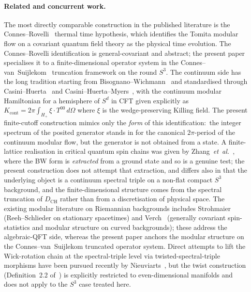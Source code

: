 \documentclass[11pt,a4paper]{article}
\theoremstyle{plain}
\theoremstyle{definition}
\newcommand{\sthree}{S^{3}}
\newcommand{\DCH}{D_{\mathrm{CH}}}
\begin{document}
\paragraph{Related and concurrent work.}
The most directly comparable construction in the published literature
is the Connes--Rovelli~\cite{connes_rovelli1994} thermal time
hypothesis, which identifies the Tomita modular flow on a covariant
quantum field theory as the physical time evolution. The
Connes--Rovelli identification is general-covariant and abstract;
the present paper specialises it to a finite-dimensional operator
system in the Connes--van~Suijlekom~\cite{connes_vs2021} truncation
framework on the round $\sthree$. The continuum side has the long
tradition starting from Bisognano--Wichmann~\cite{bisognano_wichmann1976}
and standardised through Casini--Huerta~\cite{casini_huerta2009} and
Casini--Huerta--Myers~\cite{casini_huerta_myers2011}, with the
continuum modular Hamiltonian for a hemisphere of $S^d$ in CFT given
explicitly as $K_{\mathrm{cont}} = 2\pi \int_{H_+} \xi \cdot T^{00}\,d\Omega$
where $\xi$ is the wedge-preserving Killing field. The present
finite-cutoff construction mimics only the \emph{form} of this
identification:\ the integer spectrum of the posited generator stands
in for the canonical $2\pi$-period of the continuum modular flow, but
the generator is not obtained from a state. A finite-lattice
realisation in critical quantum spin chains was given by
Zhang~\emph{et~al.}~\cite{zhu_casini2020}, where the BW form is
\emph{extracted} from a ground state and so is a genuine test; the
present construction does not attempt that extraction, and differs
also in that the underlying object is a continuum
spectral triple on a non-flat compact $\sthree$ background, and the
finite-dimensional structure comes from the spectral truncation of
$\DCH$ rather than from a discretisation of physical space. The
existing modular literature on Riemannian backgrounds includes
Strohmaier~\cite{strohmaier2006} (Reeh--Schlieder on stationary
spacetimes) and Verch~\cite{verch2001} (generally covariant
spin-statistics and modular structure on curved
backgrounds); these address the algebraic-QFT side, whereas the
present paper anchors the modular structure on the
Connes--van~Suijlekom truncated operator system. Direct attempts to
lift the Wick-rotation chain at the spectral-triple level via
twisted-spectral-triple morphisms have been pursued recently by
Nieuviarts~\cite{nieuviarts2025a, nieuviarts2024,
nieuviarts2025b_proceedings}, but the twist construction
(Definition~2.2 of~\cite{nieuviarts2025a}) is explicitly restricted to
even-dimensional manifolds and does not apply to the $\sthree$ case
treated here.
\end{document}
